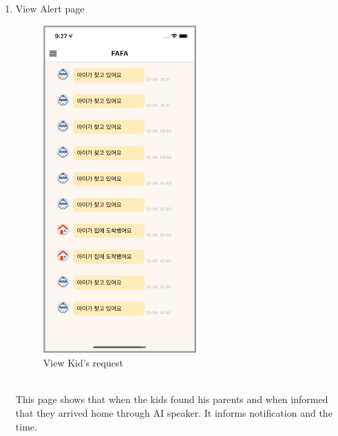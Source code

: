 \documentclass[conference]{IEEEtran}
\begin{document}
\begin{enumerate}
    \item View Alert page\\
    \begin{figure}[htbp]
    \centering
    \includegraphics{images/f10.png}
    \caption{View Kid’s request}
    \end{figure}\\
    This page shows that when the kids found his parents and when informed that they arrived home through AI speaker. It informs notification and the time.\\
    

\end{enumerate}
\end{document}
